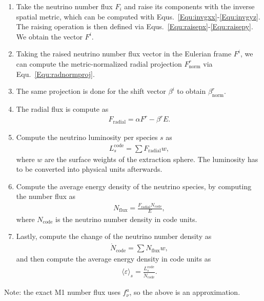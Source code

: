 \documentclass{article}
\begin{document}
\begin{enumerate}
  \item Take the neutrino number flux $F_i$ and raise its components with the inverse spatial metric, which can
  be computed with Equs.~\eqref{Equ:invgxx}-\eqref{Equ:invgyz}. The raising operation is then defined via Equs.~\eqref{Equ:raisepx}-\eqref{Equ:raisepy}.
  We obtain the vector $F^i$.
  \item Taking the raised neutrino number flux vector in the Eulerian frame $F^i$, we can compute the metric-normalized radial projection $F^r_{\mathrm{norm}}$ via
  Equ.~\eqref{Equ:radnormproj}.
  \item The same projection is done for the shift vector $\beta^i$ to obtain $\beta^r_{\mathrm{norm}}$.
  \item The radial flux is compute as
  \begin{align}
    F_{\mathrm{radial}}=\alpha F^r-\beta^rE.\nonumber
  \end{align}
  \item Compute the neutrino luminosity per species $s$ as
  \begin{align}
    L^{\mathrm{code}}_{s}=\sum F_{\mathrm{radial}}w,\nonumber
  \end{align}
  where $w$ are the surface weights of the extraction sphere. The luminosity has to be converted into physical units afterwards.
  \item Compute the average energy density of the neutrino species, by computing the number flux as
  \begin{align}
    N_{\mathrm{flux}}=\frac{F_{\mathrm{radial}}N_{\mathrm{code}}}{E},\nonumber
  \end{align}
  where $N_{\mathrm{code}}$ is the neutrino number density in code units.
  \item Lastly, compute the change of the neutrino number density as
  \begin{align}
    \Dot{N}_{\mathrm{code}}=\sum N_{\mathrm{flux}}w,\nonumber
  \end{align}
  and then compute the average energy density in code units as
  \begin{align}
    \langle\varepsilon\rangle_s=\frac{L^{\mathrm{code}}_s}{\Dot{N}_{\mathrm{code}}}.\nonumber
  \end{align}
\end{enumerate}
Note: the exact M1 number flux uses $f_{\nu}^a$, so the above is an approximation.
\end{document}
